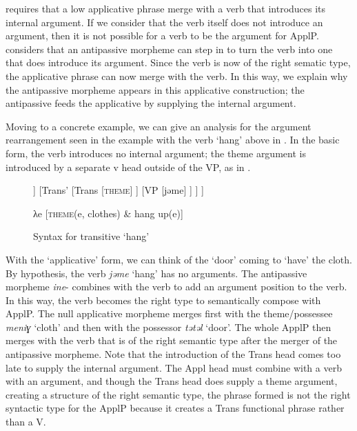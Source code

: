 \documentclass[output=paper,colorlinks,citecolor=brown,nonflat]{./langscibook}
\begin{document}
\citet{Pyllkänen2008} requires that a low applicative phrase merge with a verb that introduces its internal argument. If we consider that the verb itself does not introduce an argument, then it is not possible for a verb to be the argument for ApplP. \citet{Basilico2017} considers that an antipassive morpheme can step in to turn the verb into one that does introduce its argument. Since the verb is now of the right sematic type, the applicative phrase can now merge with the verb. In this way, we explain why the antipassive morpheme appears in this applicative construction; the antipassive feeds the applicative by supplying the internal argument.

Moving to a concrete example, we can give an analysis for the argument rearrangement seen in the example with the verb ‘hang’ above in . In the basic form, the verb introduces no internal argument; the theme argument is introduced by a separate v head outside of the VP, as in .

\begin{figure}
	\begin{forest}
			[TransP
				[NP 
					[ewirɁ-ǝ-t]
				]
				[Trans'
					[Trans
						[\textsc{theme}]
					]
					[VP
						[jǝme]
					]
				]
			]
	\end{forest}

λe [\textsc{theme}(e, clothes) \& hang up(e)]
	\caption{\label{fig:basilico:8} Syntax for transitive ‘hang’}
\end{figure}  


           

With the ‘applicative’ form, we can think of the ‘door’ coming to ‘have’ the cloth. By hypothesis, the verb \textit{jǝme} ‘hang’ has no arguments. The antipassive morpheme \textit{ine}{}- combines with the verb to add an argument position to the verb. In this way, the verb becomes the right type to semantically compose with ApplP. The null applicative morpheme merges first with the theme/possessee \textit{meniɣ} ‘cloth’ and then with the possessor \textit{tǝtǝl} ‘door’. The whole ApplP then merges with the verb that is of the right semantic type after the merger of the antipassive morpheme. Note that the introduction of the Trans head comes too late to supply the internal argument. The Appl head must combine with a verb with an argument, and though the Trans head does supply a theme argument, creating a structure of the right semantic type, the phrase formed is not the right syntactic type for the ApplP because it creates a Trans functional phrase rather than a V.
\end{document}
